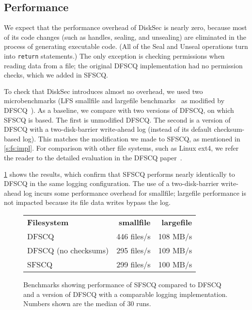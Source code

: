 \subsection{Performance}

We expect that the performance overhead of DiskSec is nearly zero, because
most of its code changes (such as handles, sealing, and unsealing) are
eliminated in the process of generating executable code.  (All of the
Seal and Unseal operations turn into \texttt{return} statements.)  The only
exception is checking permissions when reading data from a file; the
original DFSCQ implementation had no permission checks, which we added
in SFSCQ.

To check that DiskSec introduces almost no overhead,
we used two microbenchmarks (LFS smallfile and largefile
benchmarks~\cite{rosenblum:lfs} as modified by DFSCQ~\cite{chen:dfscq}).
As a baseline, we compare with two versions of DFSCQ, on which SFSCQ
is based.  The first is unmodified DFSCQ\@.  The second is a version of
DFSCQ with a two-disk-barrier write-ahead log (instead of its default
checksum-based log).  This matches the modification we made to SFSCQ, as
mentioned in \ref{s:fs:impl}.  For comparison with other file systems,
such as Linux ext4, we refer the reader to the detailed evaluation in
the DFSCQ paper~\cite[\S 7.4]{chen:dfscq}.

\ref{fig:perf} shows the results, which confirm that SFSCQ performs
nearly identically to DFSCQ in the same logging configuration.  The use
of a two-disk-barrier write-ahead log incurs some performance overhead
for smallfile; largefile performance is not impacted because its file
data writes bypass the log.

\begin{figure}[ht]
  \centering
  \begin{tabular}{lrr}
    \textbf{Filesystem} & \textbf{smallfile} & \textbf{largefile} \\
    DFSCQ & 446 files/s & 108 MB/s \\
    DFSCQ (no checksums) & 295 files/s & 109 MB/s \\
    SFSCQ & 299 files/s & 100 MB/s \\
  \end{tabular}
  \caption{Benchmarks showing performance of SFSCQ compared to DFSCQ and a
    version of DFSCQ with a comparable logging implementation.  Numbers
    shown are the median of 30 runs.}
  \label{fig:perf}
\end{figure}
